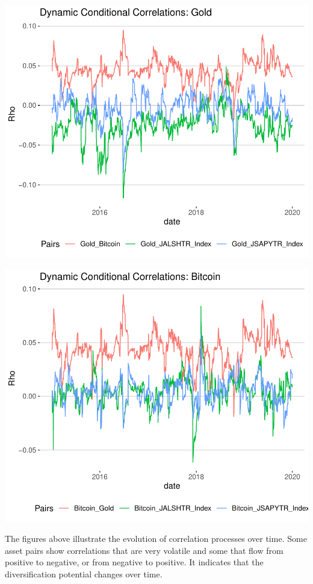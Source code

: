 \documentclass[11pt,preprint, authoryear]{elsarticle}
\numberwithin{equation}{section}
\numberwithin{figure}{section}
\numberwithin{table}{section}
\begin{document}
\includegraphics{FinMetrics-Essay_files/figure-latex/unnamed-chunk-10-1.pdf}

\includegraphics{FinMetrics-Essay_files/figure-latex/unnamed-chunk-11-1.pdf}

The figures above illustrate the evolution of correlation processes over
time. Some asset pairs show correlations that are very volatile and some
that flow from positive to negative, or from negative to positive. It
indicates that the diversification potential changes over time.
\end{document}
